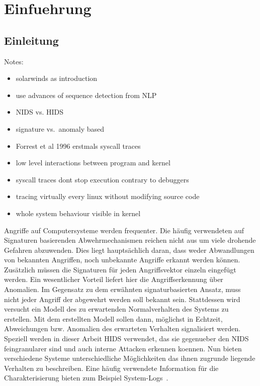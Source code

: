 \chapter{Einfuehrung}\label{ch:introduction} %
\section{Einleitung}
Notes:

\begin{itemize}
    \item solarwinds as introduction
    \item use advances of sequence detection from NLP
    \item NIDS vs. HIDS
    \item signature vs.\ anomaly based
    \item Forrest et al 1996 erstmals syscall traces
    \item low level interactions between program and kernel
    \item syscall traces dont stop execution contrary to debuggers
    \item tracing virtually every linux without modifying source code
    \item whole system behaviour visible in kernel
\end{itemize}

Angriffe auf Computersysteme werden frequenter.
Die häufig verwendeten auf Signaturen basierenden Abwehrmechanismen reichen nicht aus um viele drohende Gefahren abzuwenden.
Dies liegt hauptsächlich daran, dass weder Abwandlungen von bekannten Angriffen, noch unbekannte Angriffe erkannt werden können.
Zusätzlich müssen die Signaturen für jeden Angriffsvektor einzeln eingefügt werden.
Ein wesentlicher Vorteil liefert hier die Angriffserkennung über Anomalien.
Im Gegensatz zu dem erwähnten signaturbasierten Ansatz, muss nicht jeder Angriff der abgewehrt werden soll bekannt sein.
Stattdessen wird versucht ein Modell des zu erwartenden Normalverhalten des Systems zu erstellen.
Mit dem erstellten Modell sollen dann, möglichst in Echtzeit, Abweichungen bzw. Anomalien des erwarteten Verhalten signalisiert werden.
Speziell werden in dieser Arbeit \ac{HIDS} verwendet, das sie gegenueber den \ac{NIDS} feingranularer sind und auch interne Attacken erkennen koennen.
Nun bieten verschiedene Systeme unterschiedliche Möglichkeiten das ihnen zugrunde liegende Verhalten zu beschreiben. 
Eine häufig verwendete Information für die Charakterisierung bieten zum Beispiel System-Logs~\cite{HE}.


